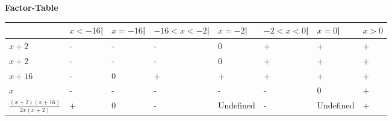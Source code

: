 \documentclass[12pt,fleqn]{book} %
\begin{document}
\begin{center}
\textbf{Factor-Table}
\begin{table}[h]
\begin{tabular}{l l l l l l l l}
\toprule
\textbf{} & \small{\textbf{$x<-16$}\hspace{3mm}|} & \small{\textbf{$x=-16$}\hspace{5mm}|} & \small{\textbf{$-16<x<-2$}\hspace{5mm}|} & \small{\textbf{$x=-2$}\hspace{5mm}|} & \small{\textbf{$-2<x<0$}}\hspace{5mm}| & \small{\textbf{$x=0$}}\hspace{5mm}| & \small{\textbf{$x>0$}}\\
\midrule
\small{$x+2$} & \hspace{5mm}- & \hspace{5mm}- & \hspace{12mm}- & \hspace{3mm}0 & \hspace{5mm}+ & \hspace{5mm}+ & \hspace{5mm}+\\
\small{$x+2$} & \hspace{5mm}- & \hspace{5mm}- & \hspace{12mm}- & \hspace{3mm}0 & \hspace{5mm}+ & \hspace{5mm}+ & \hspace{5mm}+\\
\small{$x+16$} & \hspace{5mm}- & \hspace{5mm}0 & \hspace{12mm}+ & \hspace{3mm}+ & \hspace{5mm}+ & \hspace{5mm}+ & \hspace{5mm}+ \\
\small{$x$} & \hspace{5mm}- & \hspace{5mm}- & \hspace{12mm}- & \hspace{3mm}- & \hspace{5mm}- & \hspace{5mm}0 & \hspace{5mm}+ \\
\small{$\frac{(x+2)(x+16)}{2x(x+2)}$} & \hspace{5mm}+ & \hspace{5mm}0 & \hspace{12mm}- & \small{Undefined} & \hspace{5mm}- & \small{Undefined} & \hspace{5mm}+ \\
\bottomrule
\end{tabular}
\end{table}
\end{center}
\end{document}
